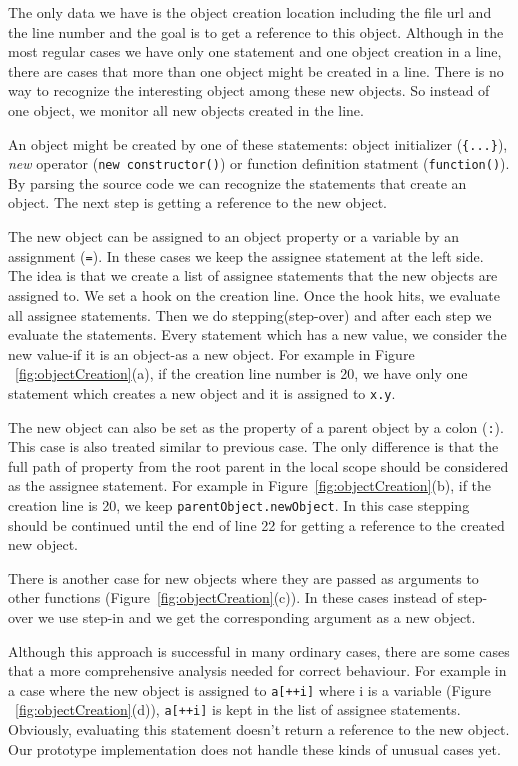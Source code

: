 \documentclass[runningheads,a4paper]{llncs}
\begin{document}
The only data we have is the object creation location including the
file url and the line number and the goal is to get a reference to
this object. Although in the most regular cases we have only one
statement and one object creation in a line, there are cases that more
than one object might be created in a line. There is no way to
recognize the interesting object among these new objects. So instead
of one object, we monitor all new objects created in the line.

An object might be created by one of these statements: object
initializer (\texttt{\{...\}}), \textit{new} operator (\texttt{new 
constructor()}) or function definition statment (\texttt{function()}). 
By parsing the source code we can recognize the statements that
create an object. The next step is getting a reference to the new object.

The new object can be assigned to an object property or a variable by
an assignment (\texttt{=}). In these cases we keep the assignee statement 
at the left side. The idea is that we create a list of assignee statements 
that the new objects are assigned to. We set a hook on the creation
line. Once the hook hits, we evaluate all assignee statements. Then 
we do stepping(step-over) and after each step we evaluate the
statements. Every statement which has a new value, we consider the new
value-if it is an object-as a new object. For example in Figure
~\ref{fig:objectCreation}(a), if the creation line number is 20, we
have only one statement which creates a new object and it is assigned
to \texttt{x.y}.

The new object can also be set as the property of a parent object by a
colon (\texttt{:}). This case is also treated similar to previous case. The
only difference is that the full path of property from the root parent
in the local scope should be considered as the assignee statement. For
example in Figure~\ref{fig:objectCreation}(b), if the creation line
is 20, we keep \texttt{parentObject.newObject}. In this case stepping
should be continued until the end of line 22 for getting a reference
to the created new object.

There is another case for new objects where they are passed as
arguments to other functions (Figure~\ref{fig:objectCreation}(c)). In these
cases instead of step-over we use step-in and we get the corresponding
argument as a new object.

Although this approach is successful in many ordinary cases, there are some 
cases that a more comprehensive analysis needed for correct behaviour. For example in a case
where the new object is assigned to \texttt{a[++i]} where i is a variable
(Figure ~\ref{fig:objectCreation}(d)), \texttt{a[++i]} is kept in the list
of assignee statements. Obviously, evaluating this statement doesn't return
a reference to the new object. Our prototype implementation does not handle these kinds of unusual cases yet.
\end{document}
